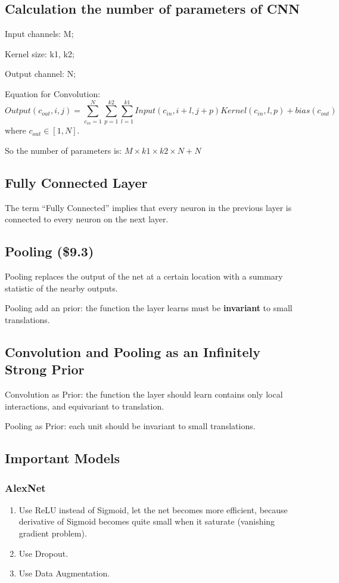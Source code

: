 \documentclass[12pt]{article}
\numberwithin{equation}{section}
\begin{document}
\subsection{Calculation the number of parameters of CNN} 
Input channels: M; \par
Kernel size: k1, k2; \par
Output channel: N; \par
Equation for Convolution:
\begin{equation}
	Output(c_{out}, i, j) = \sum_{c_{in}=1}^{N}\sum_{p=1}^{k2} \sum_{l=1}^{k1}{Input(c_{in}, i+l, j+p) Kernel(c_{in}, l, p)} + bias(c_{out})
\end{equation}
where $c_{out} \in [1, N]$. \par
So the number of parameters is: $ M \times k1 \times k2 \times N + N$

\subsection{Fully Connected Layer}
The term ``Fully Connected'' implies that every neuron in the previous layer is connected to every neuron on the next layer.

\subsection{Pooling (\$9.3)}
Pooling replaces the output of the net at a certain location with a summary statistic of the nearby outputs. \par
Pooling add an prior: the function the layer learns must be \textbf{invariant} to small translations.

\subsection{Convolution and Pooling as an Infinitely Strong Prior}
Convolution as Prior: the function the layer should learn contains only local interactions, and equivariant to translation. \par
Pooling as Prior: each unit should be invariant to small translations. \par

\subsection{Important Models}
\subsubsection{AlexNet}
\begin{enumerate}
	\item Use ReLU instead of Sigmoid, let the net becomes more efficient, because derivative of Sigmoid becomes quite small when it saturate (vanishing gradient problem).
	\item Use Dropout.
	\item Use Data Augmentation.
\end{enumerate}
\end{document}
